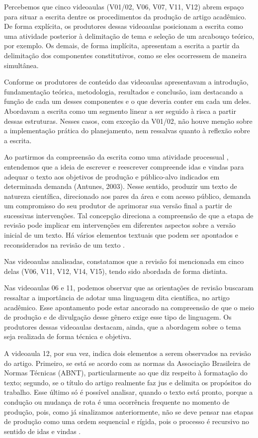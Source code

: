 Percebemos que cinco videoaulas (V01/02, V06, V07, V11, V12) abrem
espaço para situar a escrita dentre os procedimentos da produção de
artigo acadêmico. De forma explícita, os produtores dessas videoaulas
posicionam a escrita como uma atividade posterior à delimitação de tema
e seleção de um arcabouço teórico, por exemplo. Os demais, de forma
implícita, apresentam a escrita a partir da delimitação dos componentes
constitutivos, como se eles ocorressem de maneira simultânea.

Conforme os produtores de conteúdo das videoaulas apresentavam a
introdução, fundamentação teórica, metodologia, resultados e conclusão,
iam destacando a função de cada um desses componentes e o que deveria
conter em cada um deles. Abordavam a escrita como um segmento linear a
ser seguido à risca a partir dessas estruturas. Nesses casos, com
exceção da V01/02, não houve menção sobre a implementação prática do
planejamento, nem ressalvas quanto à reflexão sobre a escrita.

Ao partirmos da compreensão da escrita como uma atividade processual
\cite{antunes2003,garcez2020}, entendemos que a ideia de escrever e
reescrever compreende idas e vindas para adequar o texto aos objetivos
de produção e público-alvo indicados em determinada demanda (Antunes,
2003). Nesse sentido, produzir um texto de natureza científica,
direcionado aos pares da área e com acesso público, demanda um
compromisso do seu produtor de aprimorar sua versão final a partir de
sucessivas intervenções. Tal concepção direciona a compreensão de que a
etapa de revisão pode implicar em intervenções em diferentes aspectos
sobre a versão inicial de um texto. Há vários elementos textuais que
podem ser apontados e reconsiderados na revisão de um texto \cite{bessa2020}.

Nas videoaulas analisadas, constatamos que a revisão foi mencionada em
cinco delas (V06, V11, V12, V14, V15), tendo sido abordada de forma
distinta.

Nas videoaulas 06 e 11, podemos observar que as orientações de revisão
buscaram ressaltar a importância de adotar uma linguagem dita
científica, no artigo acadêmico. Esse apontamento pode estar ancorado na
compreensão de que o meio de produção e de divulgação desse gênero exige
esse tipo de linguagem. Os produtores dessas videoaulas destacam, ainda,
que a abordagem sobre o tema seja realizada de forma técnica e objetiva.

A videoaula 12, por sua vez, indica dois elementos a serem observados na
revisão do artigo. Primeiro, se está se acordo com as normas da
Associação Brasileira de Normas Técnicas (ABNT), particularmente ao que
diz respeito à formatação do texto; segundo, se o título do artigo
realmente faz jus e delimita os propósitos do trabalho. Esse último só é
possível analisar, quando o texto está pronto, porque a condução ou
mudança de rota é uma ocorrência frequente no momento de produção, pois,
como já sinalizamos anteriormente, não se deve pensar nas etapas de
produção como uma ordem sequencial e rígida, pois o processo é recursivo
no sentido de idas e vindas \cite{garcez2020}.

